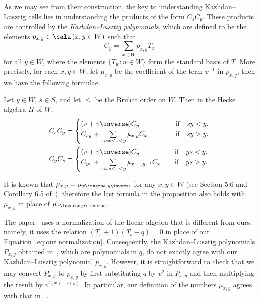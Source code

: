 As we may see from their construction, the key to understanding Kazhdan--Lusztig cells lies in
understanding the products of the form $C_sC_y$. These products are controlled
by the \emph{Kazhdan--Lusztig polynomials}, which are defined to be the elements $p_{x,y}\in \cala\, (x,y\in W)$
such that 
\[
 C_y=\sum_{x\in W} p_{x,y}T_x
\]
for all $y\in W$, where the elements $\{T_w:w\in W\}$ form the standard basis
of $T$. More precisely, for each $x,y\in W$, let $\mu_{x,y}$ be the coefficient of the term
$v^{-1}$ in $p_{x,y}$, then we have the following formulae.
\begin{prop}[{\cite[Theorem 6.6]{LG}}]
 \label{KL basis mult}
 Let $y\in W$, $s\in S$, and let $\le$ be the Bruhat order on $W$. Then in the
 Hecke algebra $H$ of $W$,
 \begin{align*}
 C_s C_y&= 
 \begin{cases}
 (v+v\inverse) C_y&\quad\qquad\text{if}\quad sy<y,\\
 C_{sy}+\sum\limits_{x:sx<x<y} \mu_{x,y}C_x&\quad\qquad \text{if} \quad
 sy>y,
 \end{cases}\\
 C_y C_s&= 
 \begin{cases}
 (v+v\inverse) C_y&\quad \text{if}\quad ys<y,\\
 C_{ys}+\sum\limits_{x:xs<x<y} \mu_{x^{-1},y^{-1}}C_x&\quad \text{if}
 \quad ys>y.
 \end{cases}
 \end{align*}
\end{prop}

\begin{rema}
 \label{symmetry}
 It is known that $\mu_{x,y}=\mu_{x\inverse,y\inverse}$ for any $x,y\in W$
 (see Section 5.6 and Corollary 6.5 of~\cite{LG}),
 therefore the last formula in the proposition also holds with $\mu_{x,y}$ in
 place of $\mu_{x\inverse,y\inverse}$.
\end{rema}

\begin{rema}
 \label{conversion}
 The paper~\cite{KL} uses a normalization of the Hecke algebra that is
 different from ours, namely, it uses the relation $(T_s+1)(T_s-q)=0$ in place
 of our Equation~\eqref{eq:our normalization}. Consequently, the
 Kazhdan--Lusztig polynomials $P_{x,y}$ obtained in~\cite{KL}, which are
 polynomials in $q$, do not exactly
 agree with our Kazhdan--Lusztig polynomial $p_{x,y}$. However, it is
 straightforward to 
 check that we may convert $P_{x,y}$ to $p_{x,y}$ by first substituting
 $q$ by $v^2$ in $P_{x,y}$ and then multiplying the result by $v^{l(x)-l(y)}$. 
 In particular, our definition of the numbers $\mu_{x,y}$ agrees with that in
~\cite{KL}.
\end{rema}

